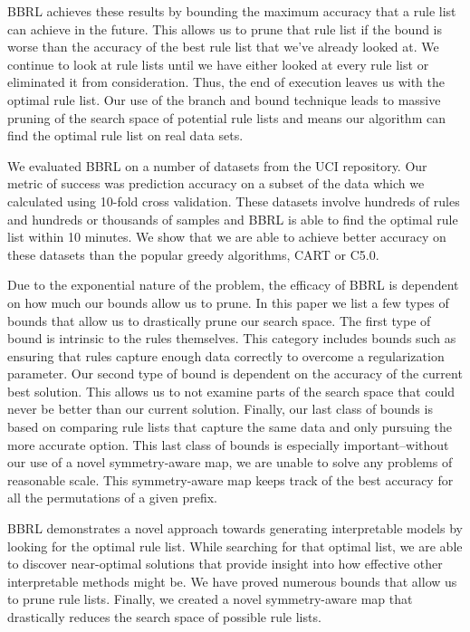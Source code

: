 \documentclass[aoas,preprint]{imsart}
\begin{document}
BBRL achieves these results by bounding the maximum accuracy that a rule list
can achieve in the future.
%
This allows us to prune that rule list if the bound is worse than the accuracy
of the best rule list that we've already looked at.
%
We continue to look at rule lists until we have either looked at every rule list
or eliminated it from consideration.
%
Thus, the end of execution leaves us with the optimal rule list.
%
Our use of the branch and bound technique leads to massive pruning of the search space of
potential rule lists and means our algorithm can find the optimal rule list on real data sets.

We evaluated BBRL on a number of datasets from the UCI repository.
%
Our metric of success was prediction accuracy on a subset of the data which
we calculated using 10-fold cross validation.
%
These datasets involve hundreds of rules and hundreds or thousands of samples
and BBRL is able to find the optimal rule list within 10 minutes.
%
We show that we are able to achieve better accuracy on these datasets than
the popular greedy algorithms, CART or C5.0.

Due to the exponential nature of the problem, the efficacy of BBRL is dependent
on how much our bounds allow us to prune.
%
In this paper we list a few types of bounds that allow us to drastically prune our search space.
%
The first type of bound is intrinsic to the rules themselves.
%
This category includes bounds such as ensuring that rules capture enough data
correctly to overcome a regularization parameter.
%
Our second type of bound is dependent on the accuracy of the current best solution.
%
This allows us to not examine parts of the search space that could never be
better than our current solution.
%
Finally, our last class of bounds is based on comparing rule lists that capture
the same data and only pursuing the more accurate option.
%
This last class of bounds is especially important--without our use of a novel
symmetry-aware map, we are unable to solve any problems of reasonable scale.
%
This symmetry-aware map keeps track of the best accuracy for all the permutations of a given prefix.

BBRL demonstrates a novel approach towards generating interpretable models by
looking for the optimal rule list.
%
While searching for that optimal list, we are able to discover near-optimal
solutions that provide insight into how effective other interpretable methods might be.
%
We have proved numerous bounds that allow us to prune rule lists.
%
Finally, we created a novel symmetry-aware map that drastically reduces the
search space of possible rule lists.
\end{document}
